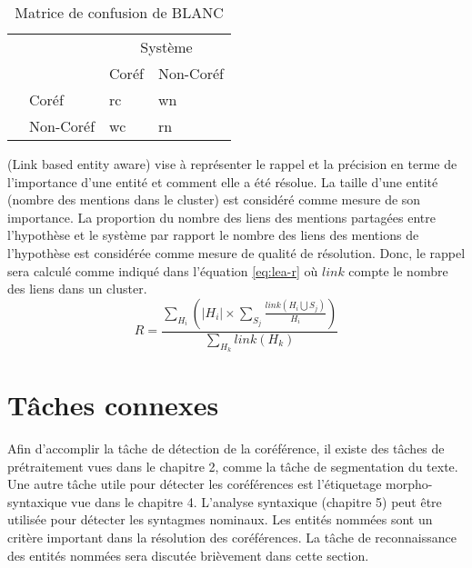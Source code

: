 \documentclass{KodeBook}
\begin{document}
\begin{table}[ht]
	\centering 
	\begin{tabular}{llll}
		\cline{3-4}\noalign{\vskip\doublerulesep
			\vskip-\arrayrulewidth}\cline{3-4}
		&& \multicolumn{2}{c}{Système} \\
		\cline{3-4}
	    && Coréf & Non-Coréf  \\
	    \cline{1-2}\noalign{\vskip\doublerulesep
	    	\vskip-\arrayrulewidth}\hline
	    
	\multirow{2}{*}{Hypothèse} & Coréf & rc & wn \\
	                       & Non-Coréf & wc & rn \\
	   \hline\hline
	\end{tabular}
	\caption[Matrice de confusion de BLANC]{Matrice de confusion de BLANC \cite{2011-recasens-hovy}}
	\label{tab:blanc-confusion}
\end{table}

 (Link based entity aware) vise à représenter le rappel et la précision en terme de l'importance d'une entité et comment elle a été résolue. 
La taille d'une entité (nombre des mentions dans le cluster) est considéré comme mesure de son importance. 
La proportion du nombre des liens des mentions partagées entre l'hypothèse et le système par rapport le nombre des liens des mentions de l'hypothèse est considérée comme mesure de qualité de résolution. 
Donc, le rappel sera calculé comme indiqué dans l'équation \ref{eq:lea-r} où $link$ compte le nombre des liens dans un cluster.
\begin{equation}\label{eq:lea-r}
R = \frac{\sum_{H_i} (|H_i| \times \sum_{S_j} \frac{link(H_i \bigcup S_j)}{H_i})}{\sum_{H_k} link(H_k)}
\end{equation}

\section{Tâches connexes}

Afin d'accomplir la tâche de détection de la coréférence, il existe des tâches de prétraitement vues dans le chapitre 2, comme la tâche de segmentation du texte. 
Une autre tâche utile pour détecter les coréférences est l'étiquetage morpho-syntaxique vue dans le chapitre 4.
L'analyse syntaxique (chapitre 5) peut être utilisée pour détecter les syntagmes nominaux. 
Les entités nommées sont un critère important dans la résolution des coréférences.
La tâche de reconnaissance des entités nommées sera discutée brièvement dans cette section.
\end{document}
